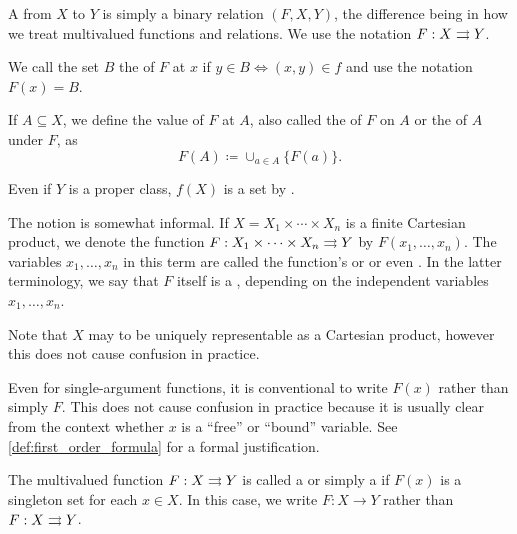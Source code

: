 \begin{definition}\label{def:function}
  A  from \( X \) to \( Y \) is simply a binary relation \( (F, X, Y) \), the difference being in how we treat multivalued functions and relations. We use the notation \( F: X \rightrightarrows Y \).

  \begin{defenum}[series=def:function]
     We call the set \( B \) the  of \( F \) at \( x \) if \( y \in B \iff (x, y) \in f \) and use the notation \( F(x) = B \).

     If \( A \subseteq X \), we define the value of \( F \) at \( A \), also called the  of \( F \) on \( A \) or the  of \( A \) under \( F \), as
    \begin{equation*}
      F(A) \coloneqq \cup_{a \in A} \{ F(a) \}.
    \end{equation*}

    Even if \( Y \) is a proper class, \( f(X) \) is a set by .

     The notion  is somewhat informal. If \( X = X_1 \times \cdots \times X_n \) is a finite Cartesian product, we denote the function \( F: X_1 \times \cdots \times X_n \rightrightarrows Y \) by \( F(x_1, \ldots, x_n) \). The variables \( x_1, \ldots, x_n \) in this term are called the function's  or  or even . In the latter terminology, we say that \( F \) itself is a , depending on the independent variables \( x_1, \ldots, x_n \).

    Note that \( X \) may to be uniquely representable as a Cartesian product, however this does not cause confusion in practice.

    Even for single-argument functions, it is conventional to write \( F(x) \) rather than simply \( F \). This does not cause confusion in practice because it is usually clear from the context whether \( x \) is a \enquote{free} or \enquote{bound} variable. See \cref{def:first_order_formula} for a formal justification.

     The multivalued function \( F: X \rightrightarrows Y \) is called a  or simply a  if \( F(x) \) is a singleton set for each \( x \in X \). In this case, we write \( F: X \to Y \) rather than \( F: X \rightrightarrows Y \).


\end{defenum}
\end{definition}
